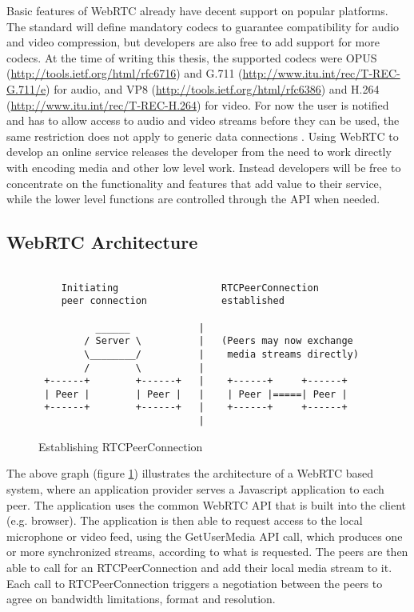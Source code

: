 \documentclass[english,12pt,a4paper,pdftex]{article}
\begin{document}
Basic features of WebRTC already have decent support on popular platforms. The standard will define mandatory codecs to guarantee compatibility for audio and video compression, but developers are also free to add support for more codecs. At the time of writing this thesis, the supported codecs were OPUS (\url{http://tools.ietf.org/html/rfc6716}) and G.711 (\url{http://www.itu.int/rec/T-REC-G.711/e}) for audio, and VP8 (\url{http://tools.ietf.org/html/rfc6386}) and H.264 (\url{http://www.itu.int/rec/T-REC-H.264}) for video. \cite{Jennings} For now the user is notified and has to allow access to audio and video streams before they can be used, the same restriction does not apply to generic data connections \cite{Johnston}. Using WebRTC to develop an online service releases the developer from the need to work directly with encoding media and other low level work. Instead developers will be free to concentrate on the functionality and features that add value to their service, while the lower level functions are controlled through the API when needed.

\subsection{WebRTC Architecture}

\begin{figure}[H]
\begin{verbatim}

    Initiating                  RTCPeerConnection
    peer connection             established
    
          ______            |
        / Server \          |   (Peers may now exchange 
        \________/          |    media streams directly)
        /        \          |
 +------+        +------+   |    +------+     +------+
 | Peer |        | Peer |   |    | Peer |=====| Peer |
 +------+        +------+   |    +------+     +------+
                            |
\end{verbatim}
\caption{Establishing RTCPeerConnection}
\label{fig:peer-connection}
\end{figure}

The above graph (figure \ref{fig:peer-connection}) illustrates the architecture of a WebRTC based system, where an application provider serves a Javascript application to each peer. The application uses the common WebRTC API that is built into the client (e.g. browser). The application is then able to request access to the local microphone or video feed, using the GetUserMedia API call, which produces one or more synchronized streams, according to what is requested. The peers are then able to call for an RTCPeerConnection and add their local media stream to it. Each call to RTCPeerConnection triggers a negotiation between the peers to agree on bandwidth limitations, format and resolution. \cite{Jennings, Garaizar}
\end{document}
